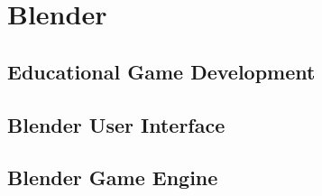 \chapter{Blender}

\section{Educational Game Development}
\section{Blender User Interface}
\section{Blender Game Engine}
